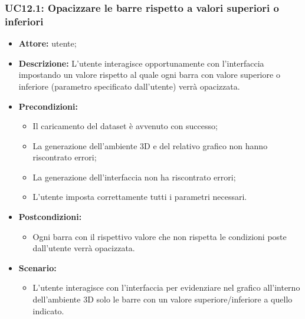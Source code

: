 \subsubsection{UC12.1: Opacizzare le barre rispetto a valori superiori o inferiori}
\begin{itemize}    
    \item \textbf{Attore:} utente;
    \item \textbf{Descrizione:} L'utente interagisce opportunamente con l'interfaccia impostando un valore rispetto al quale ogni barra con valore superiore o inferiore (parametro specificato dall'utente) verrà opacizzata.
    \item \textbf{Precondizioni:}    
        \begin{itemize}
            \item Il caricamento del dataset è avvenuto con successo;
            \item La generazione dell'ambiente 3D e del relativo grafico non hanno riscontrato errori;
            \item La generazione dell'interfaccia non ha riscontrato errori;
            \item L'utente imposta correttamente tutti i parametri necessari.
        \end{itemize}    
    \item \textbf{Postcondizioni:}
        \begin{itemize}
            \item Ogni barra con il rispettivo valore che non rispetta le condizioni poste dall'utente verrà opacizzata.
        \end{itemize}    
    \item \textbf{Scenario:} 
        \begin{itemize}
            \item L'utente interagisce con l'interfaccia per evidenziare nel grafico all'interno dell'ambiente 3D solo le barre con un valore superiore/inferiore a quello indicato.
        \end{itemize}
\end{itemize}
